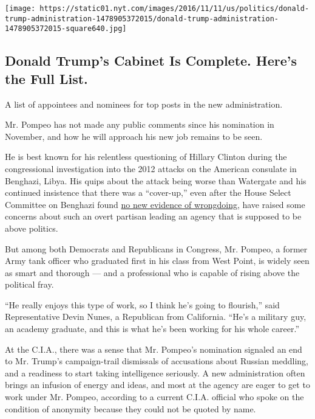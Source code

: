 \href{https://www.nytimes.com/interactive/2016/us/politics/donald-trump-administration.html}{}

\texttt{[image: https://static01.nyt.com/images/2016/11/11/us/politics/donald-trump-administration-1478905372015/donald-trump-administration-1478905372015-square640.jpg]}

\hypertarget{donald-trumps-cabinet-is-complete-heres-the-full-list}{%
\subsection{Donald Trump's Cabinet Is Complete. Here's the Full
List.}\label{donald-trumps-cabinet-is-complete-heres-the-full-list}}

A list of appointees and nominees for top posts in the new
administration.

Mr. Pompeo has not made any public comments since his nomination in
November, and how he will approach his new job remains to be seen.

He is best known for his relentless questioning of Hillary Clinton
during the congressional investigation into the 2012 attacks on the
American consulate in Benghazi, Libya. His quips about the attack being
worse than Watergate and his continued insistence that there was a
``cover-up,'' even after the House Select Committee on Benghazi found
\href{http://www.nytimes.com/2016/06/29/us/politics/hillary-clinton-benghazi.html}{no
new evidence of wrongdoing}, have raised some concerns about such an
overt partisan leading an agency that is supposed to be above politics.

But among both Democrats and Republicans in Congress, Mr. Pompeo, a
former Army tank officer who graduated first in his class from West
Point, is widely seen as smart and thorough --- and a professional who
is capable of rising above the political fray.

``He really enjoys this type of work, so I think he's going to
flourish,'' said Representative Devin Nunes, a Republican from
California. ``He's a military guy, an academy graduate, and this is what
he's been working for his whole career.''

At the C.I.A., there was a sense that Mr. Pompeo's nomination signaled
an end to Mr. Trump's campaign-trail dismissals of accusations about
Russian meddling, and a readiness to start taking intelligence
seriously. A new administration often brings an infusion of energy and
ideas, and most at the agency are eager to get to work under Mr. Pompeo,
according to a current C.I.A. official who spoke on the condition of
anonymity because they could not be quoted by name.

